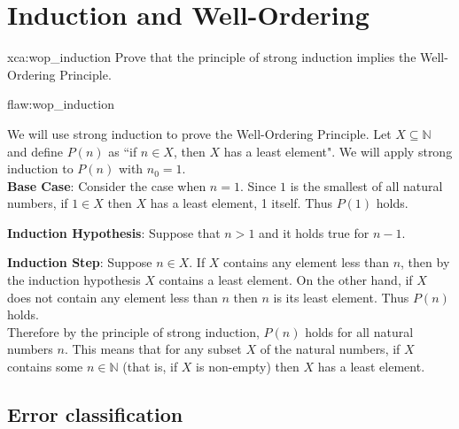 \section{Induction and Well-Ordering}

\begin{xca}{xca:wop_induction}
Prove that the principle of strong induction implies the Well-Ordering Principle. 
\end{xca}

\begin{flaw}{flaw:wop_induction} 

We will use strong induction to prove the Well-Ordering Principle. Let $X \subseteq \mathbb{N}$ and define $P(n)$ as ``if $n \in X$, then $X$ has a least element". We will apply strong induction to $P(n)$ with $n_0 = 1$. \\

\noindent\textbf{Base Case}: Consider the case when $n=1$. Since $1$ is the smallest of all natural numbers, if $1 \in X$ then $X$ has a least element, 1 itself. Thus $P(1)$ holds. 

\noindent\textbf{Induction Hypothesis}: Suppose that $n > 1$ and it holds true for $n-1$. 


\noindent\textbf{Induction Step}: Suppose $n \in X$. If $X$ contains any element less than $n$, then by the induction hypothesis $X$ contains a least element. On the other hand, if $X$ does not contain any element less than $n$ then $n$ is its least element. Thus $P(n)$ holds.  \\


Therefore by the principle of strong induction, $P(n)$ holds for all natural numbers $n$. This means that for any subset $X$ of the natural numbers, if $X$ contains some $n \in \mathbb{N}$ (that is, if $X$ is non-empty) then $X$ has a least element. 
\end{flaw}

\clearpage
\subsection{Error classification}


